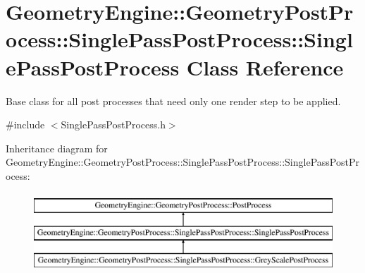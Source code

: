 \hypertarget{class_geometry_engine_1_1_geometry_post_process_1_1_single_pass_post_process_1_1_single_pass_post_process}{}\section{Geometry\+Engine\+::Geometry\+Post\+Process\+::Single\+Pass\+Post\+Process\+::Single\+Pass\+Post\+Process Class Reference}
\label{class_geometry_engine_1_1_geometry_post_process_1_1_single_pass_post_process_1_1_single_pass_post_process}


Base class for all post processes that need only one render step to be applied.  




{\ttfamily \#include $<$Single\+Pass\+Post\+Process.\+h$>$}

Inheritance diagram for Geometry\+Engine\+::Geometry\+Post\+Process\+::Single\+Pass\+Post\+Process\+::Single\+Pass\+Post\+Process\+:\begin{figure}[H]
\begin{center}
\leavevmode
\includegraphics[height=3.000000cm]{class_geometry_engine_1_1_geometry_post_process_1_1_single_pass_post_process_1_1_single_pass_post_process}
\end{center}
\end{figure}
